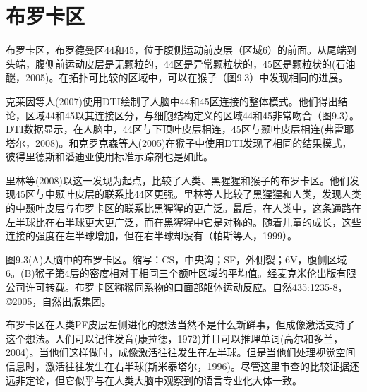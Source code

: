 \section{布罗卡区}
布罗卡区，布罗德曼区44和45，位于腹侧运动前皮层（区域6）的前面。从尾端到头端，腹侧前运动皮层是无颗粒的，44区是异常颗粒状的，45区是颗粒状的(石油醚，2005)。在拓扑可比较的区域中，可以在猴子（图9.3）中发现相同的进展。
\par
克莱因等人(2007)使用DTI绘制了人脑中44和45区连接的整体模式。他们得出结论，区域44和45以其连接区分，与细胞结构定义的区域44和45非常吻合（图9.3）。DTI数据显示，在人脑中，44区与下顶叶皮层相连，45区与颞叶皮层相连(弗雷耶塔尔，2008)。和克罗克森等人(2005)在猴子中使用DTI发现了相同的结果模式，彼得里德斯和潘迪亚使用标准示踪剂也是如此。
\par
里林等(2008)以这一发现为起点，比较了人类、黑猩猩和猴子的布罗卡区。他们发现45区与中颞叶皮层的联系比44区更强。里林等人比较了黑猩猩和人类，发现人类的中颞叶皮层与布罗卡区的联系比黑猩猩的更广泛。最后，在人类中，这条通路在左半球比在右半球更大更广泛，而在黑猩猩中它是对称的。随着儿童的成长，这些连接的强度在左半球增加，但在右半球却没有（帕斯等人，1999）。
\par
图9.3(A)人脑中的布罗卡区。缩写：CS，中央沟；SF，外侧裂；6V，腹侧区域6。(B)猴子第4层的密度相对于相同三个额叶区域的平均值。经麦克米伦出版有限公司许可转载。布罗卡区猕猴同系物的口面部躯体运动反应。自然435:1235-8，©2005，自然出版集团。
\par
布罗卡区在人类PF皮层左侧进化的想法当然不是什么新鲜事，但成像激活支持了这个想法。人们可以记住发音(康拉德，1972)并且可以推理单词(高尔和多兰，2004)。当他们这样做时，成像激活往往发生在左半球。但是当他们处理视觉空间信息时，激活往往发生在右半球(斯米泰塔尔，1996)。尽管这里审查的比较证据还远非定论，但它似乎与在人类大脑中观察到的语言专业化大体一致。
